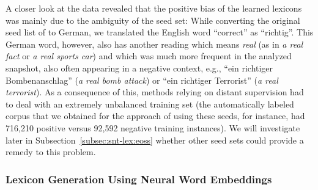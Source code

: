 A closer look at the data revealed that the positive bias of the
learned lexicons was mainly due to the ambiguity of the seed set:
While converting the original seed list of \citet{Turney:03} to
German, we translated the English word ``correct'' as ``richtig''.
This German word, however, also has another reading which means
\emph{real} (as in \emph{a real fact} or \emph{a real sports car}) and
which was much more frequent in the analyzed snapshot, also often
appearing in a negative context, e.g., ``ein richtiger
Bombenanschlag'' (\emph{a real bomb attack}) or ``ein richtiger
Terrorist'' (\emph{a real terrorist}).  As a consequence of this,
methods relying on distant supervision had to deal with an extremely
unbalanced training set (the automatically labeled corpus that we
obtained for the approach of \citet{Kiritchenko:14} using these seeds,
for instance, had 716,210 positive versus 92,592 negative training
instances).  We will investigate later in
Subsection~\ref{subsec:snt-lex:eoss} whether other seed sets could
provide a remedy to this problem.

\subsubsection{Lexicon Generation Using Neural Word Embeddings}













